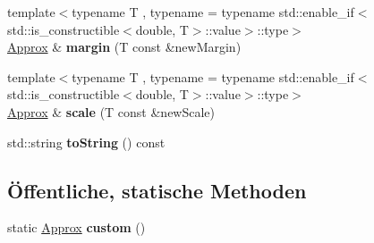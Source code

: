 \begin{DoxyCompactItemize}
\mbox{\label{classCatch_1_1Detail_1_1Approx_a6467dc18791e1a1f4c15c4fb63cf5051}} 
{\footnotesize template$<$typename T , typename  = typename std\+::enable\+\_\+if$<$std\+::is\+\_\+constructible$<$double, T$>$\+::value$>$\+::type$>$ }\\\hyperlink{classCatch_1_1Detail_1_1Approx}{Approx} \& {\bfseries margin} (T const \&new\+Margin)
\item 
\mbox{\label{classCatch_1_1Detail_1_1Approx_a8f4d2def2920a3840d3271f6d9c5ede2}} 
{\footnotesize template$<$typename T , typename  = typename std\+::enable\+\_\+if$<$std\+::is\+\_\+constructible$<$double, T$>$\+::value$>$\+::type$>$ }\\\hyperlink{classCatch_1_1Detail_1_1Approx}{Approx} \& {\bfseries scale} (T const \&new\+Scale)
\item 
\mbox{\label{classCatch_1_1Detail_1_1Approx_a972fd9ac60607483263f1b0f0f9955e6}} 
std\+::string {\bfseries to\+String} () const
\end{DoxyCompactItemize}
\subsection*{Öffentliche, statische Methoden}
\begin{DoxyCompactItemize}
\item 
\mbox{\label{classCatch_1_1Detail_1_1Approx_aaf86dc0ee92272ac2d9839197a07951d}} 
static \hyperlink{classCatch_1_1Detail_1_1Approx}{Approx} {\bfseries custom} ()
\end{DoxyCompactItemize}
